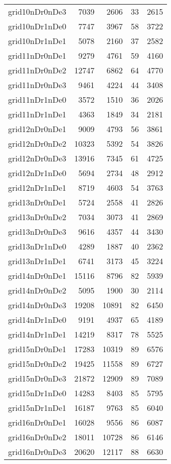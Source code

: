 \documentclass[../../../thesis.tex]{subfiles}
\begin{document}
\begin{longtable}{lrrrr}
grid10nDr0nDe3 & 7039 & 2606 & 33 & 2615 \\
grid10nDr1nDe0 & 7747 & 3967 & 58 & 3722 \\
grid10nDr1nDe1 & 5078 & 2160 & 37 & 2582 \\
grid11nDr0nDe1 & 9279 & 4761 & 59 & 4160 \\
grid11nDr0nDe2 & 12747 & 6862 & 64 & 4770 \\
grid11nDr0nDe3 & 9461 & 4224 & 44 & 3408 \\
grid11nDr1nDe0 & 3572 & 1510 & 36 & 2026 \\
grid11nDr1nDe1 & 4363 & 1849 & 34 & 2181 \\
grid12nDr0nDe1 & 9009 & 4793 & 56 & 3861 \\
grid12nDr0nDe2 & 10323 & 5392 & 54 & 3826 \\
grid12nDr0nDe3 & 13916 & 7345 & 61 & 4725 \\
grid12nDr1nDe0 & 5694 & 2734 & 48 & 2912 \\
grid12nDr1nDe1 & 8719 & 4603 & 54 & 3763 \\
grid13nDr0nDe1 & 5724 & 2558 & 41 & 2826 \\
grid13nDr0nDe2 & 7034 & 3073 & 41 & 2869 \\
grid13nDr0nDe3 & 9616 & 4357 & 44 & 3430 \\
grid13nDr1nDe0 & 4289 & 1887 & 40 & 2362 \\
grid13nDr1nDe1 & 6741 & 3173 & 45 & 3224 \\
grid14nDr0nDe1 & 15116 & 8796 & 82 & 5939 \\
grid14nDr0nDe2 & 5095 & 1900 & 30 & 2114 \\
grid14nDr0nDe3 & 19208 & 10891 & 82 & 6450 \\
grid14nDr1nDe0 & 9191 & 4937 & 65 & 4189 \\
grid14nDr1nDe1 & 14219 & 8317 & 78 & 5525 \\
grid15nDr0nDe1 & 17283 & 10319 & 89 & 6576 \\
grid15nDr0nDe2 & 19425 & 11558 & 89 & 6727 \\
grid15nDr0nDe3 & 21872 & 12909 & 89 & 7089 \\
grid15nDr1nDe0 & 14283 & 8403 & 85 & 5795 \\
grid15nDr1nDe1 & 16187 & 9763 & 85 & 6040 \\
grid16nDr0nDe1 & 16028 & 9556 & 86 & 6087 \\
grid16nDr0nDe2 & 18011 & 10728 & 86 & 6146 \\
grid16nDr0nDe3 & 20620 & 12117 & 88 & 6630 \\

\end{longtable}
\end{document}
